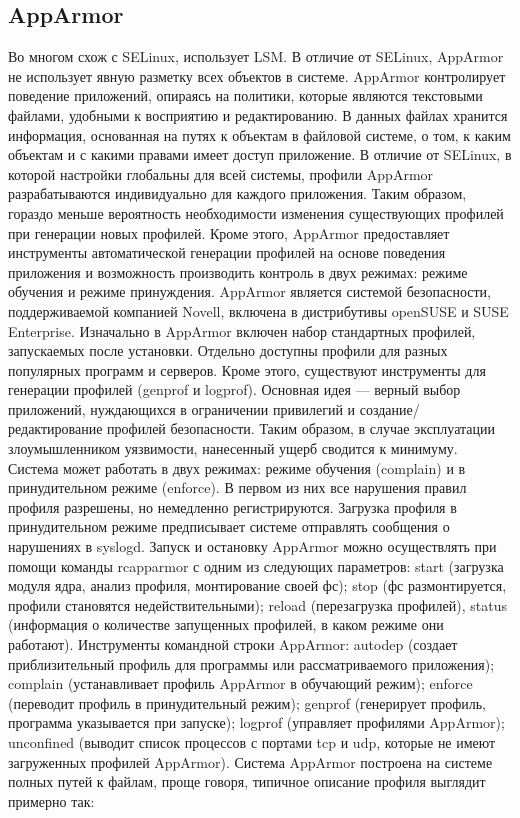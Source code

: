 \bigskip
\subsection{AppArmor}

Во многом схож с SELinux, использует LSM.
В отличие от SELinux, AppArmor не использует
явную разметку всех объектов в системе.
 AppArmor контролирует поведение 
приложений, опираясь на политики, которые являются 
текстовыми файлами, удобными к восприятию и редактированию. 
В данных файлах хранится информация, основанная на 
путях к объектам в файловой системе, о том, к каким 
объектам и с какими правами имеет доступ приложение. 
В отличие от SELinux, 
в которой настройки глобальны для всей системы, профили 
AppArmor разрабатываются индивидуально для каждого 
приложения.
Таким образом, гораздо меньше вероятность 
необходимости изменения существующих профилей при 
генерации новых профилей. Кроме этого, 
AppArmor предоставляет инструменты 
автоматической генерации профилей на основе поведения 
приложения и возможность производить контроль в двух 
режимах: режиме обучения и режиме принуждения. 
AppArmor является системой безопасности, поддерживаемой 
компанией Novell, включена в дистрибутивы openSUSE и SUSE 
Enterprise.  Изначально в AppArmor включен набор 
стандартных профилей, запускаемых после установки. 
Отдельно доступны профили для разных популярных программ 
и серверов. Кроме этого, существуют инструменты для генерации 
профилей (genprof и logprof). Основная идея — верный выбор 
приложений, нуждающихся в ограничении привилегий и 
создание/редактирование профилей безопасности. Таким 
образом, в случае эксплуатации злоумышленником 
уязвимости,  нанесенный ущерб сводится 
к минимуму. Система может работать в двух режимах: режиме 
обучения (complain) и в принудительном режиме (enforce). 
В первом из них все нарушения правил профиля разрешены, 
но немедленно регистрируются. Загрузка профиля в 
принудительном режиме предписывает системе отправлять 
сообщения о нарушениях в syslogd. Запуск и остановку 
AppArmor можно осуществлять при помощи команды rcapparmor 
с одним из следующих параметров: start (загрузка модуля 
ядра, анализ профиля, монтирование своей фс); stop (фс 
размонтируется, профили становятся недействительными); 
reload (перезагрузка профилей), status (информация о 
количестве запущенных профилей, в каком режиме они 
работают). Инструменты командной строки AppArmor: autodep 
(создает приблизительный профиль для программы или 
рассматриваемого приложения); complain (устанавливает 
профиль AppArmor в обучающий режим); enforce (переводит 
профиль в принудительный режим); genprof (генерирует профиль,
программа указывается при запуске); logprof (управляет
профилями AppArmor); unconfined (выводит список процессов 
с портами tcp и udp, которые не имеют загруженных 
профилей AppArmor). Система AppArmor построена на системе 
полных путей к файлам, проще говоря, типичное описание 
профиля выглядит примерно так: 

